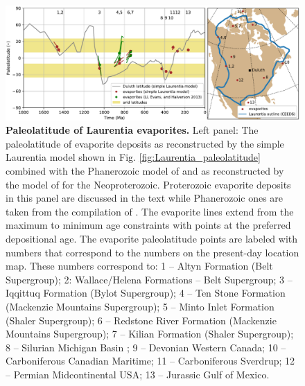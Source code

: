 \documentclass[twocolumn, switch]{article} %
\begin{document}
\begin{figure}
\centering
\includegraphics[width=7 in]{../Figures/Fig7_Laurentia_evaporite_figure.pdf}
\caption{\textbf{Paleolatitude of Laurentia evaporites.} Left panel: The paleolatitude of evaporite deposits as reconstructed by the simple Laurentia model shown in Fig. \ref{fig:Laurentia_paleolatitude} combined with the Phanerozoic model of \cite{Torsvik2017a} and as reconstructed by the model of \cite{Li2013a} for the Neoproterozoic. Proterozoic evaporite deposits in this panel are discussed in the text while Phanerozoic ones are taken from the compilation of \cite{Evans2006a}. The evaporite lines extend from the maximum to minimum age constraints with points at the preferred depositional age. The evaporite paleolatitude points are labeled with numbers that correspond to the numbers on the present-day location map. These numbers correspond to: 1 -- Altyn Formation (Belt Supergroup); 2: Wallace/Helena Formations -- Belt Supergroup; 3 -- Iqqittuq Formation (Bylot Supergroup); 4 -- Ten Stone Formation (Mackenzie Mountains Supergroup); 5 -- Minto Inlet Formation (Shaler Supergroup); 6 -- Redstone River Formation (Mackenzie Mountains Supergroup); 7 -- Kilian Formation (Shaler Supergroup); 8 -- Silurian Michigan Basin ; 9 -- Devonian Western Canada; 10 -- Carboniferous Canadian Maritime; 11 -- Carboniferous Sverdrup; 12 -- Permian Midcontinental USA; 13 -- Jurassic Gulf of Mexico.}
\label{fig:Laurentia_evaporites}
\end{figure}
\end{document}
